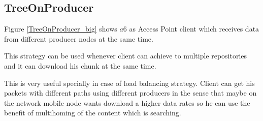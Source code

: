 \subsection{TreeOnProducer}
Figure \ref{TreeOnProducer_big} shows $a6$ as Access Point client which receives data from different producer nodes at the same time.

This strategy can be used whenever client can achieve to multiple repositories and it can download his chunk at the same time.

This is very useful specially in case of load balancing strategy. Client can get his packets with different paths using different producers in the sense that maybe on the network mobile node wants download a higher data rates so he can use the benefit of multihoming of the content which is searching.

